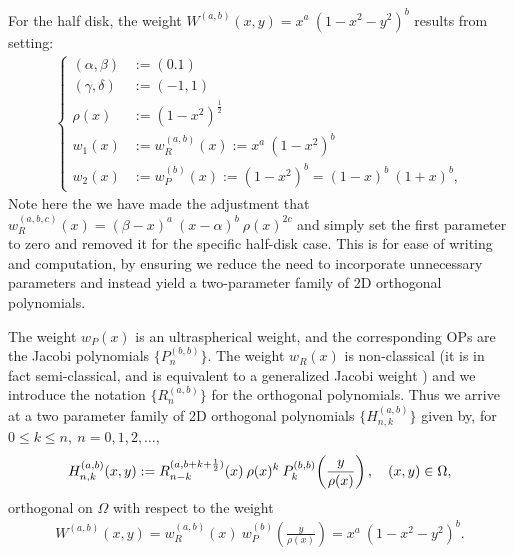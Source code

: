 \documentclass[11pt, oneside]{article}   	%
\newcommand{\half}{\frac{1}{2}}
\newcommand{\hdop}{H}
\newcommand{\hdopnk}{\hdop_{n,k}}
\newcommand{\hdopnkab}{\hdop_{n,k}^{(a,b)}}
\newcommand{\genjac}{R}
\newcommand{\genjacnmk}{\genjac_{n-k}}
\newcommand{\genjacw}{w_\genjac}
\begin{document}
For the half disk, the weight $W^{(a,b)}(x,y) = x^a \: (1-x^2-y^2)^b$ results from setting:
\begin{align*}
\begin{cases}
(\alpha,\beta) &:= (0.1) \\
(\gamma,\delta) &:= (-1,1) \\
\rho(x) &:= (1-x^2)^{\half} \\
w_1(x) &:= \genjacw^{(a,b)}(x) := x^a \: (1-x^2)^b \\
w_2(x) &:= w_P^{(b)}(x) := (1-x^2)^b = (1-x)^b \: (1+x)^b,
\end{cases}
\end{align*}
Note here the we have made the adjustment that $\genjacw^{(a,b,c)}(x) = (\beta - x)^a \: (x - \alpha)^{b} \: \rho(x)^{2c}$ and simply set the first parameter to zero and removed it for the specific half-disk case. This is for ease of writing and computation, by ensuring we reduce the need to incorporate unnecessary parameters and instead yield a two-parameter family of 2D orthogonal polynomials. 

The weight $w_P(x)$ is an ultraspherical weight, and the corresponding OPs are the Jacobi polynomials  $\{P_n^{(b, b)}\}$. The weight $w_R(x)$ is non-classical (it is in fact semi-classical, and is equivalent to a generalized Jacobi weight \cite[\S5]{magnus1995painleve}) and we introduce the notation $\{\genjac_n^{(a, b)}\}$ for the orthogonal polynomials. Thus we arrive at a two parameter family of 2D orthogonal polynomials $\{\hdopnkab\}$ given by, for $0 \le k \le n, \: n = 0,1,2,\dots,$
\begin{align}\label{eq:diskpolys}
 \hdopnk^{(a,b)}(x,y) := \genjacnmk^{(a, b+k+\half)}(x) \: \rho(x)^k \: P_k^{(b,b)}\fpr(\frac{y}{\rho(x)}), \quad (x,y) \in \Omega, 
\end{align}
orthogonal on \(\Omega\) with respect to the weight
\begin{align*}
W^{(a,b)}(x,y) = \genjacw^{(a,b)}(x) \: w_P^{(b)}(\frac{y}{\rho(x)}) = x^a \: (1-x^2-y^2)^b.
\end{align*}
\end{document}
